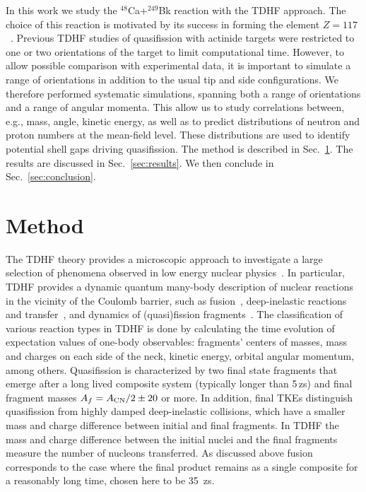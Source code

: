 \documentclass[reprint,aps,prc,twocolumn,floatfix,10pt]{revtex4-2}
\begin{document}
In this work we study the $^{48}$Ca+$^{249}$Bk reaction with the TDHF approach.
The choice of this reaction is motivated by its success in
forming the element $Z=117$~\cite{oganessian2010,oganessian2011,oganessian2012,oganessian2013,khuyagbaatar2014}.
Previous TDHF studies of quasifission with actinide targets were restricted to one or two orientations of the target to limit computational time.
However, to allow possible comparison with experimental data, it is important to simulate a range of orientations in addition to the usual tip and side configurations.
We therefore performed systematic simulations, spanning both a range of orientations and a range of angular momenta.
This allow us to study correlations between, e.g.,  mass, angle, kinetic energy, as well as to predict distributions of neutron and proton numbers at the mean-field level.
These distributions are used to identify potential shell gaps driving quasifission.
The method is described in Sec.~\ref{sec:method}.
The results are discussed in Sec.~\ref{sec:results}.
We then conclude in Sec.~\ref{sec:conclusion}.


\section{Method}\label{sec:method}

The TDHF theory provides a microscopic approach to investigate
a large selection of phenomena
observed in low energy nuclear physics~\cite{negele1982,simenel2012,simenel2018}.
In particular, TDHF provides a dynamic quantum many-body description of
nuclear reactions in the
vicinity of the Coulomb barrier, such as fusion~\cite{bonche1978,flocard1978,simenel2001,umar2008a,umar2006d,
washiyama2008,umar2010a,guo2012,keser2012,simenel2013a,oberacker2012,oberacker2010,umar2012a,simenel2013b,umar2014a,jiang2014},
deep-inelastic reactions and transfer~\cite{koonin1977,simenel2010,simenel2011,umar2008a,
sekizawa2013,scamps2013a,sekizawa2014,bourgin2016,umar2017,sekizawa2019},
and dynamics of (quasi)fission fragments~\cite{umar2010a,wakhle2014,oberacker2014,simenel2014a,
umar2015a,umar2015c,scamps2015a,goddard2015,bulgac2016,sekizawa2016,umar2016}.
The classification of various reaction types in TDHF is done by calculating the
time evolution of expectation values of one-body observables:
fragments' centers of masses, mass and charges on each side of the neck, kinetic energy,
orbital angular momentum, among others. Quasifission is characterized by two final
state fragments that emerge after a long lived composite system (typically longer
than 5\,zs) and final fragment masses $A_{f} = A_{\rm CN}/2 \pm 20$ or more. In
addition, final TKEs distinguish quasifission from highly damped deep-inelastic
collisions, which have a smaller mass and charge difference between initial and
final fragments. In TDHF the mass and charge difference between the initial nuclei
and the final fragments measure the number of nucleons transferred. As discussed
above fusion corresponds to the case where the final product remains as a single composite
for a reasonably long time, chosen here to be 35~zs.
\end{document}
